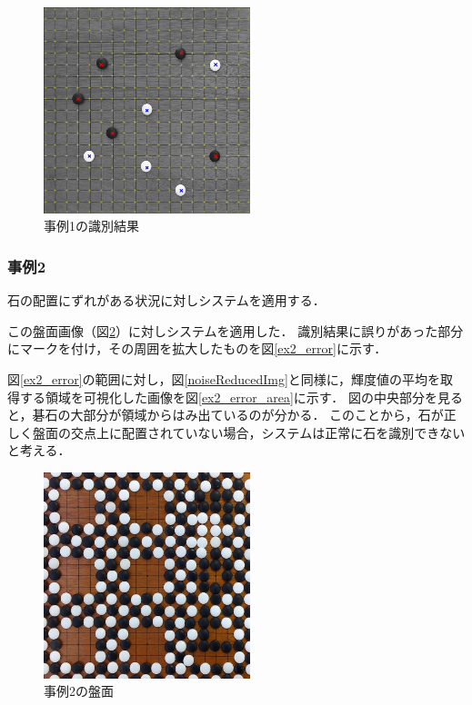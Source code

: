 \documentclass[openright]{nitocs}
\numberwithin{equation}{section}
\begin{document}
                \begin{figure}[tb] %
                    \begin{center}
                    \includegraphics[clip,width=60mm]{DSC_0041/result.jpg} 
                    \caption{事例1の識別結果}
                    \label{ex1_result}
                    \end{center}
                \end{figure}

            \subsubsection{事例2} %
                石の配置にずれがある状況に対しシステムを適用する．

                この盤面画像（図\ref{ex2_img}）に対しシステムを適用した．
                識別結果に誤りがあった部分にマークを付け，その周囲を拡大したものを図\ref{ex2_error}に示す．

                図\ref{ex2_error}の範囲に対し，図\ref{noiseReducedImg}と同様に，輝度値の平均を取得する領域を可視化した画像を図\ref{ex2_error_area}に示す．
                図の中央部分を見ると，碁石の大部分が領域からはみ出ているのが分かる．
                このことから，石が正しく盤面の交点上に配置されていない場合，システムは正常に石を識別できないと考える．
                
                
                \begin{figure}[tb] %
                    \begin{center}
                    \includegraphics[clip,width=60mm]{DSC_0099/boardImg.jpg} 
                    \caption{事例2の盤面}
                    \label{ex2_img}
                    \end{center}
                \end{figure}
\end{document}
